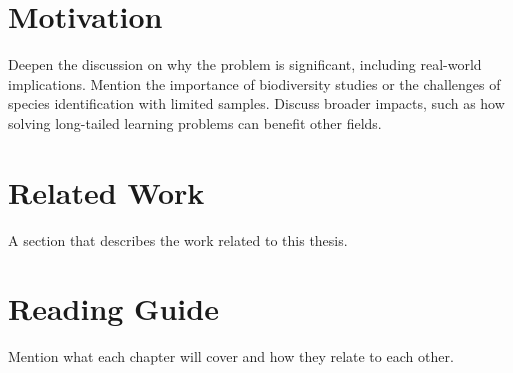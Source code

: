\section{Motivation}
Deepen the discussion on why the problem is significant, including real-world implications.
Mention the importance of biodiversity studies or the challenges of species identification with limited samples.
Discuss broader impacts, such as how solving long-tailed learning problems can benefit other fields.

\section{Related Work}
A section that describes the work related to this thesis. 

\section{Reading Guide}
Mention what each chapter will cover and how they relate to each other.

